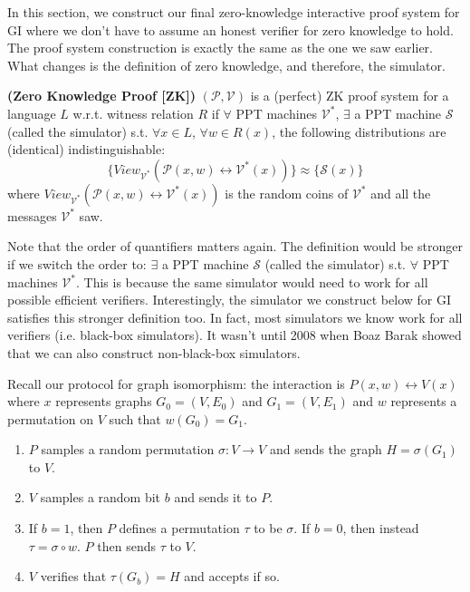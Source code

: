 In this section, we construct our final zero-knowledge interactive proof system for GI where we don't have to assume an honest verifier for zero knowledge to hold. The proof system construction is exactly the same as the one we saw earlier. What changes is the definition of zero knowledge, and therefore, the simulator. 

\begin{definition} {\normalfont\textbf{(Zero Knowledge Proof [ZK])}} 
	$(\mathcal{P},\mathcal{V})$ is a (perfect) ZK proof system for a language $L$ w.r.t. witness relation $R$ if $\forall$ PPT machines $\mathcal{V}^*$,
	$\exists$ a PPT machine $\mathcal{S}$ (called the simulator) s.t. $\forall x \in L$, $\forall w\in R(x)$, the following distributions are (identical) indistinguishable:
$$\{View_{\mathcal{V^*}}(\mathcal{P}(x,w) \leftrightarrow \mathcal{V^*}(x))\} \approx \{\mathcal{S}(x)\}$$
where $View_{\mathcal{V^*}}(\mathcal{P}(x,w) \leftrightarrow \mathcal{V^*}(x))$ is the random coins of $\mathcal{V^*}$ and all the messages $\mathcal{V^*}$ saw.
\end{definition}
\begin{remark}
	Note that the order of quantifiers matters again. The definition would be stronger if we switch the order to: $\exists$ a PPT machine $\mathcal{S}$ (called the simulator) s.t. $\forall$ PPT machines $\mathcal{V}^*$. This is because the same simulator would need to work for all possible efficient verifiers. Interestingly, the simulator we construct below for GI satisfies this stronger definition too. In fact, most simulators we know work for all verifiers (i.e. black-box simulators). It wasn't until 2008 when Boaz Barak showed that we can also construct non-black-box simulators. 
\end{remark}

Recall our protocol for graph isomorphism: the interaction is $P(x,w) \leftrightarrow V(x)$ where $x$ represents graphs $G_0 = (V, E_0)$ and $G_1 = (V, E_1)$ and $w$ represents a permutation on $V$ such that $w (G_0) = G_1$.

\begin{enumerate}
\item $P$ samples a random permutation $\sigma: V \to V$ and sends the graph $H = \sigma(G_1)$ to $V$.

\item $V$ samples a random bit $b$ and sends it to $P$.

\item If $b = 1$, then $P$ defines a permutation $\tau$ to be $\sigma$. If $b = 0$, then instead $\tau = \sigma \circ w$. $P$ then sends $\tau$ to $V$.

\item $V$ verifies that $\tau(G_b) = H$ and accepts if so.

\end{enumerate}

